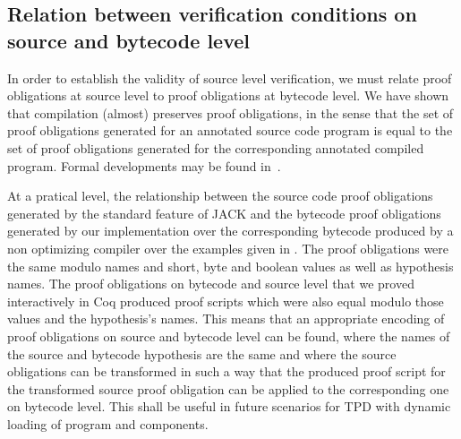 
 \subsection{Relation between verification conditions on source and
 bytecode level } \label{pogEquiv} 

In order to establish the validity of source level verification, we
must relate proof obligations at source level to proof obligations at
bytecode level. We have shown that compilation (almost) preserves
proof obligations, in the sense that the set of proof obligations
generated for an annotated source code program is equal to the set of
proof obligations generated for the corresponding annotated compiled
program. Formal developments may be found
in~\cite{gta05:fast,BP06:sac}.


At a pratical level, the relationship between the source code proof
obligations generated by the standard feature of JACK and the bytecode
proof obligations generated by our implementation over the
corresponding bytecode produced by a non optimizing compiler over the
examples given in \cite{JPVC03JKM}. The proof obligations were the
same modulo names and short, byte and boolean values as well as
hypothesis names. The proof obligations on bytecode and source level
that we proved interactively in Coq produced proof scripts which were
also equal modulo those values and the hypothesis's names. This means
that an appropriate encoding of proof obligations on source and
bytecode level can be found, where the names of the source and
bytecode hypothesis are the same and where the source obligations can
be transformed in such a way that the produced proof script for the
transformed source proof obligation can be applied to the
corresponding one on bytecode level. This shall be useful in future
scenarios for TPD with dynamic loading of program and components.



 

